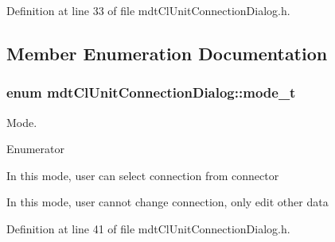 Definition at line 33 of file mdt\-Cl\-Unit\-Connection\-Dialog.\-h.



\subsection{Member Enumeration Documentation}
\hypertarget{classmdt_cl_unit_connection_dialog_a754889f1591eddb79b69de4c51532f43}{
\subsubsection[{mode\-\_\-t}]{\setlength{\rightskip}{0pt plus 5cm}enum {\bf mdt\-Cl\-Unit\-Connection\-Dialog\-::mode\-\_\-t}}}\label{classmdt_cl_unit_connection_dialog_a754889f1591eddb79b69de4c51532f43}


Mode. 

\begin{Desc}
\item[Enumerator]\par
\begin{description}
\item[{\em 
\hypertarget{classmdt_cl_unit_connection_dialog_a754889f1591eddb79b69de4c51532f43a65365660e45940b053efbf543aa2c10c}{Add}\label{classmdt_cl_unit_connection_dialog_a754889f1591eddb79b69de4c51532f43a65365660e45940b053efbf543aa2c10c}
}]In this mode, user can select connection from connector \item[{\em 
\hypertarget{classmdt_cl_unit_connection_dialog_a754889f1591eddb79b69de4c51532f43a855eaf8093ea6043e46688cc5115643f}{Edit}\label{classmdt_cl_unit_connection_dialog_a754889f1591eddb79b69de4c51532f43a855eaf8093ea6043e46688cc5115643f}
}]In this mode, user cannot change connection, only edit other data \end{description}
\end{Desc}


Definition at line 41 of file mdt\-Cl\-Unit\-Connection\-Dialog.\-h.



